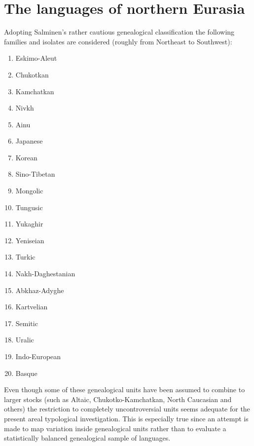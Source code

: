 \section{The languages of northern Eurasia}
Adopting Salminen's rather cautious genealogical classification the following families and isolates are considered (roughly from Northeast to Southwest):
\begin{multicols}{2}
\begin{enumerate}
\item{Eskimo-Aleut}
\item{Chukotkan}
\item{Kamchatkan}
\item{Nivkh}
\item{Ainu}
\item{Japanese}
\item{Korean}
\item{Sino-Tibetan}
\item{Mongolic}
\item{Tungusic}
\item{Yukaghir}
\item{Yeniseian}
\item{Turkic}
\item{Nakh-Daghestanian}
\item{Abkhaz-Adyghe}
\item{Kartvelian}
\item{Semitic}
\item{Uralic}
\item{Indo-European}
\item{Basque}
\end{enumerate}
\end{multicols}
Even though some of these genealogical units have been assumed to combine to larger stocks (such as Altaic, Chukotko-Kamchatkan, North Caucasian and others) the restriction to completely uncontroversial units seems adequate for the present areal typological investigation. This is especially true since an attempt is made to map variation inside genealogical units rather than to evaluate a statistically balanced genealogical sample of languages.

